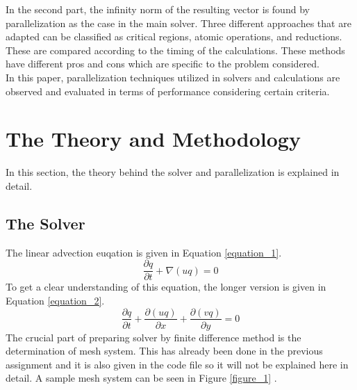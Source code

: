 \documentclass{article}
\begin{document}
 In the second part, the infinity norm of the resulting vector is found by parallelization as the case in the main solver. Three different approaches that are adapted can be classified as critical regions, atomic operations, and reductions. These are compared according to the timing of the calculations. These methods have different pros and cons which are specific to the problem considered. \\

 In this paper, parallelization techniques utilized in solvers and calculations are observed and evaluated in terms of performance considering certain criteria. 
\clearpage


\clearpage
\section{The Theory and Methodology}
\label{Theory_section}
In this section, the theory behind the solver and parallelization is explained in detail. 
\subsection{The Solver}
The linear advection euqation is given in Equation \ref{equation_1}. 
\begin{equation} %
    \frac{\partial q}{\partial t} + \nabla (uq) = 0 
    \label{equation_1}
\end{equation}
To get a clear understanding of this equation, the longer version is given in Equation \ref{equation_2}. 
\begin{equation} %
    \frac{\partial q}{\partial t} + \frac{\partial (uq)}{\partial x} + \frac{\partial (vq)}{\partial y} = 0 
    \label{equation_2}
\end{equation}
The crucial part of preparing solver by finite difference method is the determination of mesh system. This has already been done in the previous assignment and it is also given in the code file so it will not be explained here in detail. A sample mesh system can be seen in Figure \ref{figure_1} . 
\end{document}
